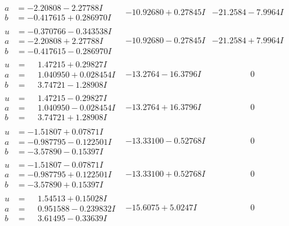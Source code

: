 \documentclass[1p]{elsarticle_modified}
\theoremstyle{definition}
\begin{document}
$$\begin{array}{c|c|c}
\begin{aligned}
a &= -2.20808 - 2.27788 I \\
b &= -0.417615 + 0.286970 I\end{aligned}
 & -10.92680 + 0.27845 I & -21.2584 - 7.9964 I \\ \hline\begin{aligned}
u &= -0.370766 - 0.343538 I \\
a &= -2.20808 + 2.27788 I \\
b &= -0.417615 - 0.286970 I\end{aligned}
 & -10.92680 - 0.27845 I & -21.2584 + 7.9964 I \\ \hline\begin{aligned}
u &= \phantom{-}1.47215 + 0.29827 I \\
a &= \phantom{-}1.040950 + 0.028454 I \\
b &= \phantom{-}3.74721 - 1.28908 I\end{aligned}
 & -13.2764 - 16.3796 I & \phantom{-0.000000 } 0 \\ \hline\begin{aligned}
u &= \phantom{-}1.47215 - 0.29827 I \\
a &= \phantom{-}1.040950 - 0.028454 I \\
b &= \phantom{-}3.74721 + 1.28908 I\end{aligned}
 & -13.2764 + 16.3796 I & \phantom{-0.000000 } 0 \\ \hline\begin{aligned}
u &= -1.51807 + 0.07871 I \\
a &= -0.987795 - 0.122501 I \\
b &= -3.57890 - 0.15397 I\end{aligned}
 & -13.33100 - 0.52768 I & \phantom{-0.000000 } 0 \\ \hline\begin{aligned}
u &= -1.51807 - 0.07871 I \\
a &= -0.987795 + 0.122501 I \\
b &= -3.57890 + 0.15397 I\end{aligned}
 & -13.33100 + 0.52768 I & \phantom{-0.000000 } 0 \\ \hline\begin{aligned}
u &= \phantom{-}1.54513 + 0.15028 I \\
a &= \phantom{-}0.951588 - 0.239832 I \\
b &= \phantom{-}3.61495 - 0.33639 I\end{aligned}
 & -15.6075 + 5.0247 I & \phantom{-0.000000 } 0 \\ \hline\begin{aligned}

\end{aligned}
\end{array}$$
\end{document}
